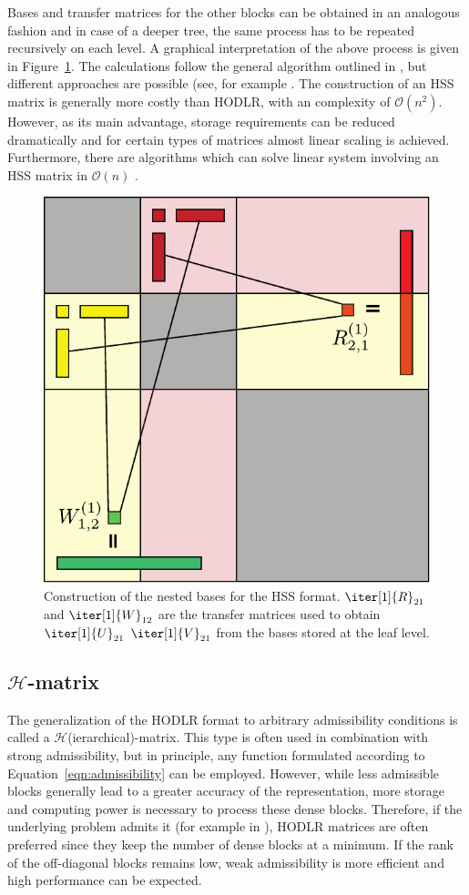\noindent Bases and transfer matrices for the other blocks can be obtained in an analogous fashion and in case of a deeper tree, the same process has to be repeated recursively on each level. A graphical interpretation of the above process is given in Figure~\hyperref[fig:nested_bases]{\ref{fig:nested_bases}}. The calculations follow the general algorithm outlined in \cite{xia_fast_2010}, but different approaches are possible (see, for example \cite{martinsson_fast_2011}. The construction of an HSS matrix is generally more costly than HODLR, with an complexity of $\mathcal{O}(n^2)$. However, as its main advantage, storage requirements can be reduced dramatically and for certain types of matrices almost linear scaling is achieved. Furthermore, there are algorithms which can solve linear system involving an HSS matrix in $\mathcal{O}(n)$ \cite{chandrasekaran_fast_2006}.

\begin{figure}[h]
    \centering
    \includegraphics[width=0.6\linewidth]{chapters/4_hierarchical_matrices/figures/nested_basis.pdf}
    \caption[Nested Bases Construction]{Construction of the nested bases for the HSS format. $\iter[1]{R}_{21}$ and $\iter[1]{W}_{12}$ are the transfer matrices used to obtain $\iter[1]{U}_{21}$ $\iter[1]{V}_{21}$ from the bases stored at the leaf level.}
    \label{fig:nested_bases}
\end{figure}

\subsection{\texorpdfstring{$\mathcal{H}$}{H}-matrix}
\label{sec:h_matrix}
The generalization of the HODLR format to arbitrary admissibility conditions is called a $\mathcal{H}$(ierarchical)-matrix. This type is often used in combination with strong admissibility, but in principle, any function formulated according to Equation~\hyperref[eqn:admissibility]{\ref{eqn:admissibility}} can be employed. However, while less admissible blocks generally lead to a greater accuracy of the representation, more storage and computing power is necessary to process these dense blocks. Therefore, if the underlying problem admits it (for example in \cite{ambikasaran_fast_2016}), HODLR matrices are often preferred since they keep the number of dense blocks at a minimum. If the rank of the off-diagonal blocks remains low, weak admissibility is more efficient and high performance can be expected.

